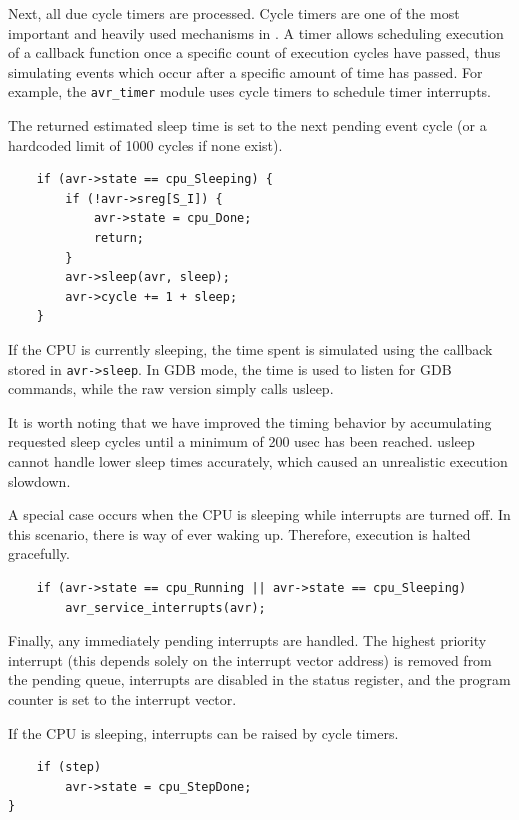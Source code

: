 Next, all due cycle timers are processed. Cycle timers are one of the
most important and heavily used mechanisms in \simavr. A timer allows scheduling
execution of a callback function once a specific count of execution cycles have
passed, thus simulating events which occur after a specific amount of time has
passed. For example, the \lstinline|avr_timer| module uses cycle timers to schedule timer
interrupts.

The returned estimated sleep time is set to the next pending event cycle (or a
hardcoded limit of 1000 cycles if none exist).

\begin{lstlisting}
    if (avr->state == cpu_Sleeping) {
        if (!avr->sreg[S_I]) {
            avr->state = cpu_Done;
            return;
        }
        avr->sleep(avr, sleep);
        avr->cycle += 1 + sleep;
    }
\end{lstlisting}

If the \ac{CPU} is currently sleeping, the time spent is simulated using the callback
stored in \lstinline|avr->sleep|. In \ac{GDB} mode, the time is used to listen for
\ac{GDB} commands, while the raw version simply calls usleep.

It is worth noting that
we have improved the timing behavior by accumulating requested sleep cycles until
a minimum of 200 usec has been reached. usleep cannot handle lower sleep times
accurately, which caused an unrealistic execution slowdown.

A special case occurs when the \ac{CPU} is sleeping while interrupts are turned off.
In this scenario, there is way of ever waking up. Therefore, execution is halted
gracefully.

\begin{lstlisting}
    if (avr->state == cpu_Running || avr->state == cpu_Sleeping)
        avr_service_interrupts(avr);
\end{lstlisting}

Finally, any immediately pending interrupts are handled. The highest priority
interrupt (this depends solely on the interrupt vector address) is removed from
the pending queue, interrupts are disabled in the status register, and the
program counter is set to the interrupt vector.

If the \ac{CPU} is sleeping, interrupts can be raised by cycle timers.

\begin{lstlisting}
    if (step)
        avr->state = cpu_StepDone;
}
\end{lstlisting}

